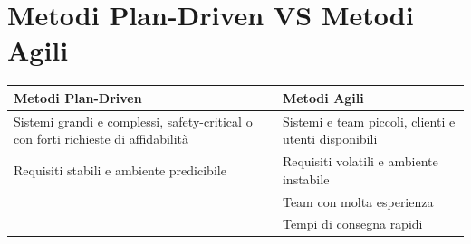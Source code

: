 \documentclass[12pt, a4paper]{report}
\begin{document}
\section{Metodi Plan-Driven VS Metodi Agili}
\begin{center}
    \begin{tabular}{| p{8cm} | p{7cm} |}
        \hline
        \textbf{Metodi Plan-Driven} & \textbf{Metodi Agili} \\
        \hline
        Sistemi grandi e complessi, safety-critical o con forti richieste di affidabilità & Sistemi e team piccoli, clienti e utenti disponibili \\
        \hline
        Requisiti stabili e ambiente predicibile & Requisiti volatili e ambiente instabile \\
        \hline
        & Team con molta esperienza \\
        \hline
        & Tempi di consegna rapidi \\
        \hline
    \end{tabular}
\end{center}
\end{document}
